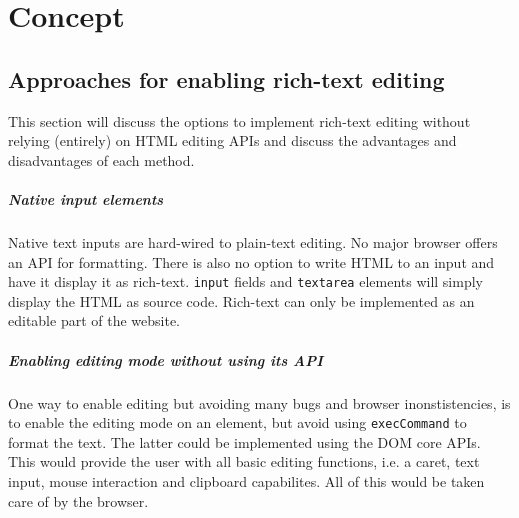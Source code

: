 \chapter{Concept}
\label{ch:concept}

\section{Approaches for enabling rich-text editing}


This section will discuss the options to implement rich-text editing without relying (entirely) on HTML editing APIs and discuss the advantages and disadvantages of each method. %

\paragraph{Native input elements} Native text inputs are hard-wired to plain-text editing. No major browser offers an API for formatting. There is also no option to write HTML to an input and have it display it as rich-text. \texttt{input} fields and \texttt{textarea} elements will simply display the HTML as source code. Rich-text can only be implemented as an editable part of the website.

\paragraph{Enabling editing mode without using its API} One way to enable editing but avoiding many bugs and browser inonstistencies, is to enable the editing mode on an element, but avoid using \texttt{execCommand} to format the text. The latter could be implemented using the DOM core APIs. This would provide the user with all basic editing functions, i.e. a caret, text input, mouse interaction and clipboard capabilites. All of this would be taken care of by the browser.


